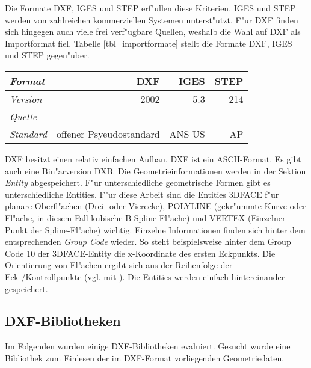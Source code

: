Die Formate DXF, IGES und STEP erf"ullen diese Kriterien. IGES und STEP 
werden von zahlreichen kommerziellen Systemen unterst"utzt. F"ur DXF finden 
sich hingegen auch viele frei verf"ugbare Quellen, weshalb die Wahl auf
DXF als Importformat fiel. Tabelle \ref{tbl_importformate} stellt die Formate
DXF, IGES und STEP gegen"uber. 

\tabbeg{}
\newcommand\headline[4]
    {\textbf{\emph{#1}} & \textbf{#2} & \textbf{#3} & \textbf{#4} \\}
\newcommand{\feature}[4]{\emph{#1} & #2 & #3 & #4 \\ \hline }
\begin{tabular}{|l|rrr|}
\hline
\headline{Format}{DXF}{IGES}{STEP}
\hline
\feature{Version}{2002}{5.3}{214}
\feature{Quelle}{\cite{dxf_ref}}{\cite{iges_docu}}{\cite{step_docu}}
\feature{Standard}{offener Psyeudostandard}{ANS US}{AP}
\end{tabular}

DXF besitzt einen relativ einfachen Aufbau. DXF ist ein ASCII-Format. Es gibt 
auch eine Bin"arversion DXB. Die Geometrieinformationen werden in der Sektion
\emph{Entity} abgespeichert. F"ur unterschiedliche geometrische Formen gibt 
es unterschiedliche Entities. F"ur diese Arbeit sind die Entities 3DFACE 
f"ur planare Oberfl"achen (Drei- oder Vierecke), POLYLINE (gekr"ummte Kurve 
oder Fl"ache, in diesem Fall kubische B-Spline-Fl"ache) und VERTEX (Einzelner 
Punkt der Spline-Fl"ache) wichtig. Einzelne Informationen finden sich hinter 
dem entsprechenden \emph{Group Code} wieder. So steht beispielsweise 
hinter dem Group Code 10 der 3DFACE-Entity die x-Koordinate des ersten 
Eckpunkts. Die Orientierung von Fl"achen ergibt sich aus der Reihenfolge 
der Eck-/Kontrollpunkte (vgl. mit ).
Die Entities werden einfach hintereinander gespeichert. 

\subsection{DXF-Bibliotheken}
\label{dxf_bibliotheken}
Im Folgenden wurden einige DXF-Bibliotheken evaluiert. Gesucht wurde eine 
Bibliothek zum Einlesen der im DXF-Format vorliegenden Geometriedaten. 

